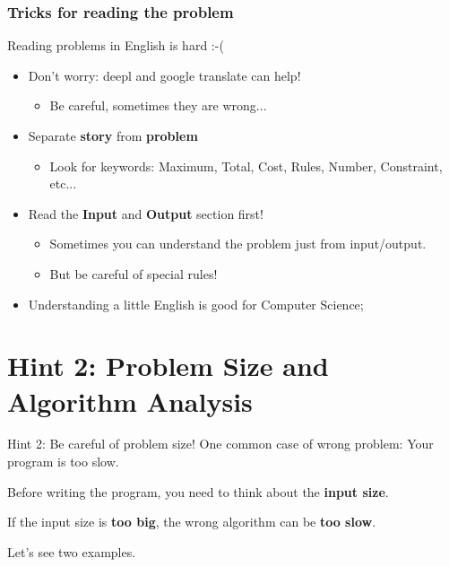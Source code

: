 \begin{frame}
  \frametitle{Tricks for reading the problem}

  \begin{alertblock}{}
    Reading problems in English is hard :-(
  \end{alertblock}

  \begin{itemize}
    \item Don't worry: deepl and google translate can help!
    \begin{itemize}
      \item Be careful, sometimes they are wrong...
    \end{itemize}\medskip

    \item Separate {\bf story} from {\bf problem}
    \begin{itemize}
      \item Look for keywords: Maximum, Total, Cost, Rules, Number, Constraint, etc...
    \end{itemize}\medskip

    \item Read the {\bf Input} and {\bf Output} section first!
    \begin{itemize}
      \item Sometimes you can understand the problem just from input/output.
      \item But be careful of special rules!
    \end{itemize}\medskip

    \item Understanding a little English is good for Computer Science;

  \end{itemize}
\end{frame}

\section{Hint 2: Problem Size and Algorithm Analysis}

\begin{frame}{Hint 2: Be careful of problem size!}
  One common case of wrong problem: Your program is too slow.\bigskip

  Before writing the program, you need to think about the {\bf input size}.\bigskip

  If the input size is {\bf too big}, the wrong algorithm can be {\bf too slow}.\bigskip

  Let's see two examples.
\end{frame}


